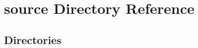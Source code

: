 \section{source Directory Reference}
\label{dir_b2f33c71d4aa5e7af42a1ca61ff5af1b}
\subsection*{Directories}
\begin{DoxyCompactItemize}
\end{DoxyCompactItemize}
